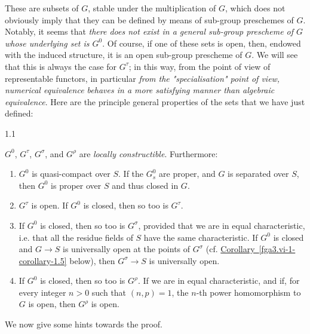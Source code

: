   These are subsets of \(G\), stable under the multiplication of \(G\), which does not obviously imply that they can be defined by means of sub-group preschemes of \(G\).
  Notably, it seems that \emph{there does not exist in a general sub-group prescheme of \(G\) whose underlying set is \(G^0\)}.
  Of course, if one of these sets is open, then, endowed with the induced structure, it is an open sub-group prescheme of \(G\).
  We will see that this is always the case for \(G^\tau \);
  in this way, from the point of view of representable functors, in particular \emph{from the "specialisation" point of view, numerical equivalence behaves in a more satisfying manner than algebraic equivalence}.
  Here are the principle general properties of the sets that we have just defined:\begin{theorem}{1.1}\label{fga3.vi-1-theorem-1.1}\skipsinglepar\par{}\(G^0\), \(G^\tau \), \(G^\sigma \), and \(G^\rho \) are \emph{locally constructible}.
    Furthermore:

    
 \begin{enumerate}
      
 \item[i.]
        \(G^0\) is quasi-compact over \(S\).
        If the \(G_s^0\) are proper, and \(G\) is separated over \(S\), then \(G^0\) is proper over \(S\) and thus closed in \(G\).
      

      
 \item[ii.]
        \(G^\tau \) is open.
        If \(G^0\) is closed, then so too is \(G^\tau \).
      

      
 \item[iii.]
        If \(G^0\) is closed, then so too is \(G^\sigma \), provided that we are in equal characteristic, i.e. that all the residue fields of \(S\) have the same characteristic.
        If \(G^0\) is closed and \(G\to  S\) is universally open at the points of \(G^\sigma \) (cf. \hyperref[fga3.vi-1-corollary-1.5]{Corollary~\ref*{fga3.vi-1-corollary-1.5}} below), then \(G^\sigma \to  S\) is universally open.
      

      
 \item[iv.]
        If \(G^0\) is closed, then so too is \(G^\rho \).
        If we are in equal characteristic, and if, for every integer \(n>0\) such that \((n,p)=1\), the \(n\)-th power homomorphism to \(G\) is open, then \(G^\rho \) is open.
      

    \end{enumerate}\end{theorem}\par{}We now give some hints towards the proof.
